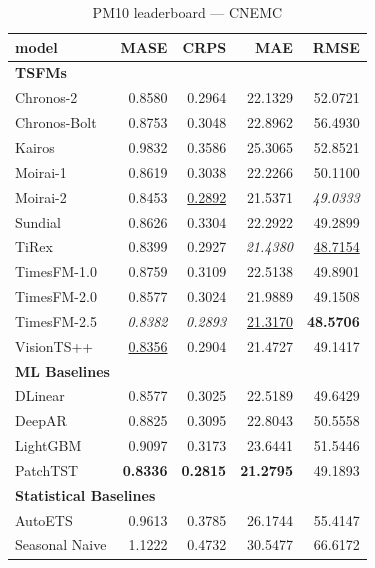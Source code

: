 \begin{table}[H]
\caption{PM10 leaderboard --- CNEMC}
\centering
\begin{small}
\begin{tabular}{lrrrr}
\toprule
model & MASE & CRPS & MAE & RMSE \\
\midrule
\multicolumn{5}{l}{\textbf{TSFMs}} \\
Chronos-2 & 0.8580 & 0.2964 & 22.1329 & 52.0721 \\
Chronos-Bolt & 0.8753 & 0.3048 & 22.8962 & 56.4930 \\
Kairos & 0.9832 & 0.3586 & 25.3065 & 52.8521 \\
Moirai-1 & 0.8619 & 0.3038 & 22.2266 & 50.1100 \\
Moirai-2 & 0.8453 & \underline{0.2892} & 21.5371 & \textit{49.0333} \\
Sundial & 0.8626 & 0.3304 & 22.2922 & 49.2899 \\
TiRex & 0.8399 & 0.2927 & \textit{21.4380} & \underline{48.7154} \\
TimesFM-1.0 & 0.8759 & 0.3109 & 22.5138 & 49.8901 \\
TimesFM-2.0 & 0.8577 & 0.3024 & 21.9889 & 49.1508 \\
TimesFM-2.5 & \textit{0.8382} & \textit{0.2893} & \underline{21.3170} & \textbf{48.5706} \\
VisionTS++ & \underline{0.8356} & 0.2904 & 21.4727 & 49.1417 \\
\midrule
\multicolumn{5}{l}{\textbf{ML Baselines}} \\
DLinear & 0.8577 & 0.3025 & 22.5189 & 49.6429 \\
DeepAR & 0.8825 & 0.3095 & 22.8043 & 50.5558 \\
LightGBM & 0.9097 & 0.3173 & 23.6441 & 51.5446 \\
PatchTST & \textbf{0.8336} & \textbf{0.2815} & \textbf{21.2795} & 49.1893 \\
\midrule
\multicolumn{5}{l}{\textbf{Statistical Baselines}} \\
AutoETS & 0.9613 & 0.3785 & 26.1744 & 55.4147 \\
Seasonal Naive & 1.1222 & 0.4732 & 30.5477 & 66.6172 \\
\bottomrule
\end{tabular}
\end{small}
\end{table}
